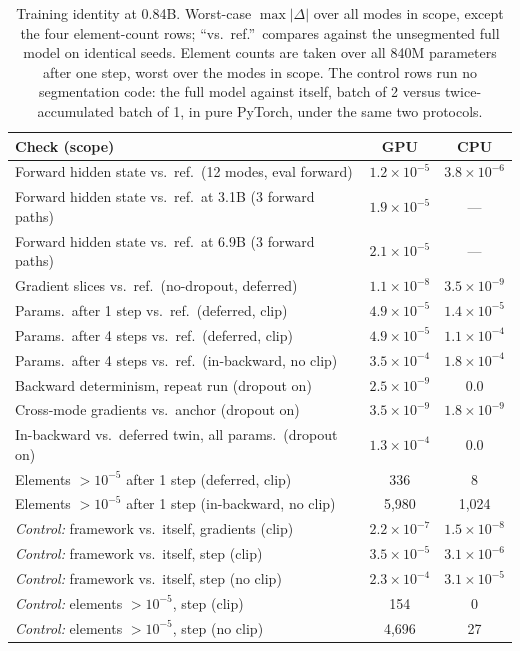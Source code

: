 \documentclass[journal]{IEEEtran}
\begin{document}
\begin{table}[t]
\caption{Training identity at 0.84B. Worst-case $\max|\Delta|$ over all
modes in scope, except the four element-count rows; ``vs.\ ref.''\ compares against the unsegmented full model
on identical seeds. Element counts are taken over all 840M parameters after
one step, worst over the modes in scope. The control rows run no segmentation code: the full model against
itself, batch of 2 versus twice-accumulated batch of 1, in pure PyTorch,
under the same two protocols.}
\label{tab:identity}
\centering
\scriptsize
\setlength{\tabcolsep}{3pt}
\begin{tabular}{@{}lcc@{}}
\toprule
Check (scope) & GPU & CPU \\
\midrule
Forward hidden state vs.\ ref.\ (12 modes, eval forward) & $1.2{\times}10^{-5}$ & $3.8{\times}10^{-6}$ \\
Forward hidden state vs.\ ref.\ at 3.1B (3 forward paths) & $1.9{\times}10^{-5}$ & --- \\
Forward hidden state vs.\ ref.\ at 6.9B (3 forward paths) & $2.1{\times}10^{-5}$ & --- \\
Gradient slices vs.\ ref.\ (no-dropout, deferred) & $1.1{\times}10^{-8}$ & $3.5{\times}10^{-9}$ \\
Params.\ after 1 step vs.\ ref.\ (deferred, clip) & $4.9{\times}10^{-5}$ & $1.4{\times}10^{-5}$ \\
Params.\ after 4 steps vs.\ ref.\ (deferred, clip) & $4.9{\times}10^{-5}$ & $1.1{\times}10^{-4}$ \\
Params.\ after 4 steps vs.\ ref.\ (in-backward, no clip) & $3.5{\times}10^{-4}$ & $1.8{\times}10^{-4}$ \\
Backward determinism, repeat run (dropout on) & $2.5{\times}10^{-9}$ & $\mathbf{0.0}$ \\
Cross-mode gradients vs.\ anchor (dropout on) & $3.5{\times}10^{-9}$ & $1.8{\times}10^{-9}$ \\
In-backward vs.\ deferred twin, all params.\ (dropout on) & $1.3{\times}10^{-4}$ & $\mathbf{0.0}$ \\
Elements $>10^{-5}$ after 1 step (deferred, clip) & 336 & 8 \\
Elements $>10^{-5}$ after 1 step (in-backward, no clip) & 5{,}980 & 1{,}024 \\
\midrule
\emph{Control:} framework vs.\ itself, gradients (clip) & $2.2{\times}10^{-7}$ & $1.5{\times}10^{-8}$ \\
\emph{Control:} framework vs.\ itself, step (clip) & $3.5{\times}10^{-5}$ & $3.1{\times}10^{-6}$ \\
\emph{Control:} framework vs.\ itself, step (no clip) & $2.3{\times}10^{-4}$ & $3.1{\times}10^{-5}$ \\
\emph{Control:} elements $>10^{-5}$, step (clip) & 154 & 0 \\
\emph{Control:} elements $>10^{-5}$, step (no clip) & 4{,}696 & 27 \\
\bottomrule
\end{tabular}
\end{table}
\end{document}
